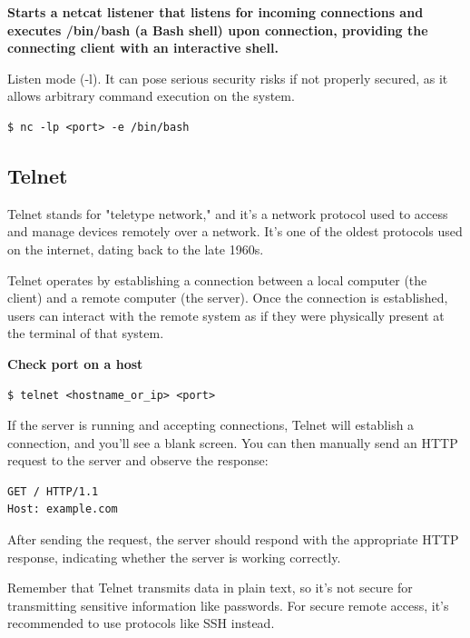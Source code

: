 \documentclass{article}
\newenvironment{blocktemplateIII}[1]{%
    \tcolorbox[beamer,%
    noparskip,breakable,
    ,colframe=Red,%
    colbacklower=LimeGreen!75!LightGreen,%
    title=#1]}%
    {\endtcolorbox}
\newenvironment{codetemplate}[1][]{%
  \mybasecolorbox[#1]
  \itshape
}{%
  \endmybasecolorbox
}
\begin{document}
\textbf{Starts a netcat listener that listens for incoming connections and executes /bin/bash (a Bash shell) upon connection, providing the connecting client with an interactive shell.}

Listen mode (-l). It can pose serious security risks if not properly secured, as it allows arbitrary command execution on the system. 
\begin{codetemplate}{}
\begin{verbatim}
$ nc -lp <port> -e /bin/bash
\end{verbatim}
\end{codetemplate}

\subsection{Telnet}

Telnet stands for "teletype network," and it's a network protocol used to access and manage devices remotely over a network. It's one of the oldest protocols used on the internet, dating back to the late 1960s.

Telnet operates by establishing a connection between a local computer (the client) and a remote computer (the server). Once the connection is established, users can interact with the remote system as if they were physically present at the terminal of that system.

\textbf{Check port on a host}
\begin{codetemplate}
\begin{verbatim}
$ telnet <hostname_or_ip> <port>
\end{verbatim}
\end{codetemplate}

If the server is running and accepting connections, Telnet will establish a connection, and you'll see a blank screen. You can then manually send an HTTP request to the server and observe the response:

\begin{codetemplate}
\begin{verbatim}
GET / HTTP/1.1
Host: example.com
\end{verbatim}
\end{codetemplate}

After sending the request, the server should respond with the appropriate HTTP response, indicating whether the server is working correctly.

\begin{blocktemplateIII}{WARNING}
Remember that Telnet transmits data in plain text, so it's not secure for transmitting sensitive information like passwords. For secure remote access, it's recommended to use protocols like SSH instead.
\end{blocktemplateIII}
\end{document}
